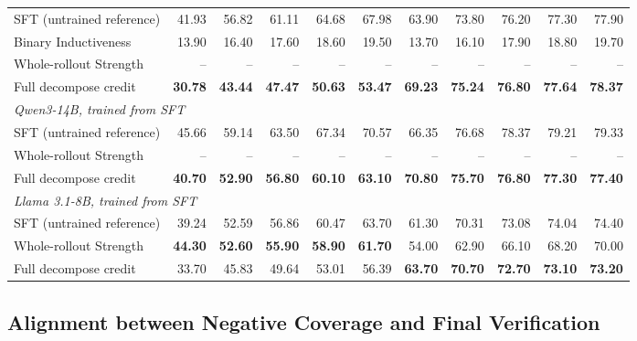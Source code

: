 \begin{table}[H]
\begin{tabular}{lrrrrrrrrrr}
SFT (untrained reference)
  & 41.93 & 56.82 & 61.11 & 64.68 & 67.98
  & 63.90 & 73.80 & 76.20 & 77.30 & 77.90 \\
Binary Inductiveness
  & 13.90 & 16.40 & 17.60 & 18.60 & 19.50
  & 13.70 & 16.10 & 17.90 & 18.80 & 19.70 \\
Whole-rollout Strength
  & -- & -- & -- & -- & -- & -- & -- & -- & -- & -- \\
Full decompose credit
  & \textbf{30.78} & \textbf{43.44} & \textbf{47.47} & \textbf{50.63} & \textbf{53.47}
  & \textbf{69.23} & \textbf{75.24} & \textbf{76.80} & \textbf{77.64} & \textbf{78.37} \\
\midrule
\multicolumn{11}{l}{\textit{Qwen3-14B, trained from SFT}} \\
SFT (untrained reference)
  & 45.66 & 59.14 & 63.50 & 67.34 & 70.57
  & 66.35 & 76.68 & 78.37 & 79.21 & 79.33 \\
Whole-rollout Strength
  & -- & -- & -- & -- & -- & -- & -- & -- & -- & -- \\
Full decompose credit
  & \textbf{40.70} & \textbf{52.90} & \textbf{56.80} & \textbf{60.10} & \textbf{63.10}
  & \textbf{70.80} & \textbf{75.70} & \textbf{76.80} & \textbf{77.30} & \textbf{77.40} \\
\midrule
\multicolumn{11}{l}{\textit{Llama 3.1-8B, trained from SFT}} \\
SFT (untrained reference)
  & 39.24 & 52.59 & 56.86 & 60.47 & 63.70
  & 61.30 & 70.31 & 73.08 & 74.04 & 74.40 \\
Whole-rollout Strength
  & \textbf{44.30} & \textbf{52.60} & \textbf{55.90} & \textbf{58.90} & \textbf{61.70}
  & 54.00 & 62.90 & 66.10 & 68.20 & 70.00 \\
Full decompose credit
  & 33.70 & 45.83 & 49.64 & 53.01 & 56.39
  & \textbf{63.70} & \textbf{70.70} & \textbf{72.70} & \textbf{73.10} & \textbf{73.20} \\
\bottomrule
\end{tabular}
\end{table}


\subsection{Alignment between Negative Coverage and Final Verification}
\label{app:coverage-predictiveness}


